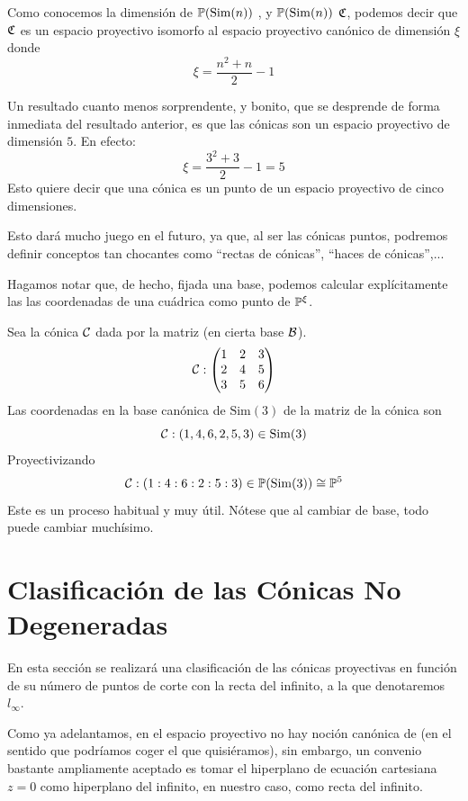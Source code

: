 Como conocemos la dimensión de $\mathbb{P}(\mathrm{Sim}(n))$ , y $\mathbb{P}(\mathrm{Sim}(n))$  $\mathfrak{C}$, podemos decir que $\mathfrak{C}$ es un espacio proyectivo isomorfo al espacio proyectivo canónico de dimensión $\xi$ donde \[\xi=\frac{n^2+n}{2}-1\]

\begin{obs}
	Un resultado cuanto menos sorprendente, y bonito, que se desprende de forma inmediata del resultado anterior, es que las cónicas son un espacio proyectivo de dimensión $5$. En efecto:
	\[\xi=\frac{3^2+3}{2}-1=5\]
	Esto quiere decir que una cónica es un punto de un espacio proyectivo de cinco dimensiones.
	
	Esto dará mucho juego en el futuro, ya que, al ser las cónicas puntos, podremos definir conceptos tan chocantes como ``rectas de cónicas'', ``haces de cónicas'',...
\end{obs}
Hagamos notar que, de hecho, fijada una base, podemos calcular explícitamente las las coordenadas de una cuádrica como punto de $\mathbb{P}^\xi$.
\begin{exa}
	Sea la cónica $\mathcal{C}$ dada por la matriz (en cierta base $\mathcal{B}$).
	\[\mathcal{C}:\begin{pmatrix}
	1 & 2 & 3\\
	2 & 4 & 5\\
	3 & 5 & 6
	\end{pmatrix}\]
	Las coordenadas en la base canónica de $\mathrm{Sim}(3)$ de la matriz de la cónica son
	\[\mathcal{C}:(1,4,6,2,5,3)\in\mathrm{Sim}(3)\]
	Proyectivizando
	\[\mathcal{C}:(1:4:6:2:5:3)\in\mathbb{P}(\mathrm{Sim}(3))\cong\mathbb{P}^5\]
	Este es un proceso habitual y muy útil. Nótese que al cambiar de base, todo puede cambiar muchísimo.
\end{exa}
\section{Clasificación de las Cónicas No Degeneradas}
En esta sección se realizará una clasificación de las cónicas proyectivas en función de su número de puntos de corte con la recta del infinito, a la que denotaremos $l_\infty$.

Como ya adelantamos, en el espacio proyectivo no hay noción canónica de  (en el sentido que podríamos coger el que quisiéramos), sin embargo, un convenio bastante ampliamente aceptado es tomar el hiperplano de ecuación cartesiana $z=0$ como hiperplano del infinito, en nuestro caso, como recta del infinito.

